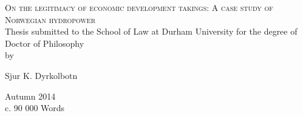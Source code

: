 \begin{titlepage}

\begin{center}



\vspace*{\fill}
\centering

{\Huge\textsc{On the legitimacy of economic development takings: A case study of Norwegian hydropower}}\\[3cm]

\large {Thesis submitted to the School of Law at Durham University for the degree of Doctor of Philosophy}\\

by

{Sjur K. Dyrkolbotn}\\

\vspace*{\fill}

 

\vfill

{\Large Autumn 2014}\\
{c. 90 000 Words}

\end{center}

\end{titlepage}
